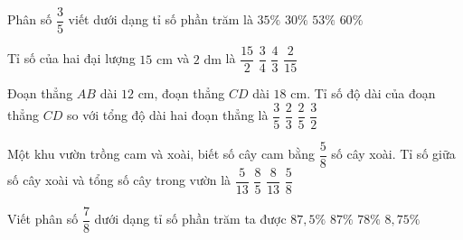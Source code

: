 \begin{ex} %
Phân số $\dfrac{3}{5}$ viết dưới dạng tỉ số phần trăm là
\choice
{$35\%$}
{$30\%$}
{$53\%$}
{\True $60\%$}
\end{ex}

\begin{ex} %
Tỉ số của hai đại lượng $15\text{ cm}$ và $2\text{ dm}$ là
\choice
{$\dfrac{15}{2}$}
{\True $\dfrac{3}{4}$}
{$\dfrac{4}{3}$}
{$\dfrac{2}{15}$}
\end{ex}

\begin{ex} %
Đoạn thẳng $AB$ dài $12\text{ cm}$, đoạn thẳng $CD$ dài $18\text{ cm}$. Tỉ số độ dài của đoạn thẳng $CD$ so với tổng độ dài hai đoạn thẳng là
\choice
{\True $\dfrac{3}{5}$}
{$\dfrac{2}{3}$}
{$\dfrac{2}{5}$}
{$\dfrac{3}{2}$}
\end{ex}

\begin{ex} %
Một khu vườn trồng cam và xoài, biết số cây cam bằng $\dfrac{5}{8}$ số cây xoài. Tỉ số giữa số cây xoài và tổng số cây trong vườn là
\choice
{$\dfrac{5}{13}$}
{$\dfrac{8}{5}$}
{\True $\dfrac{8}{13}$}
{$\dfrac{5}{8}$}
\end{ex}

\begin{ex} %
Viết phân số $\dfrac{7}{8}$ dưới dạng tỉ số phần trăm ta được
\choice
{\True $87{,}5\%$}
{$87\%$}
{$78\%$}
{$8{,}75\%$}
\end{ex}


